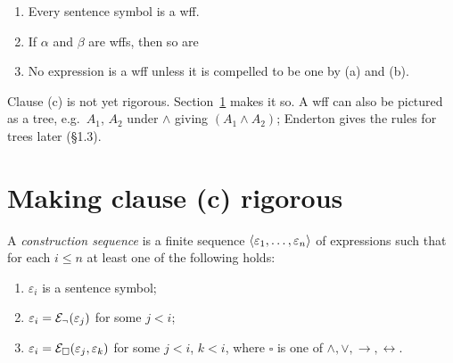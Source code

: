 \documentclass[11pt]{article}
\begin{document}
\begin{definition}\label{def:wff-informal}
\begin{enumerate}[label=(\alph*)]
\item Every sentence symbol is a wff.
\item If $\alpha$ and $\beta$ are wffs, then so are
\item No expression is a wff unless it is compelled to be one by (a) and (b).
\end{enumerate}
\end{definition}

\begin{remark}
Clause (c) is not yet rigorous. Section~\ref{sec:rigorous} makes it so.
A wff can also be pictured as a tree, e.g.\ $A_1$, $A_2$ under $\land$
giving $(A_1\land A_2)$; Enderton gives the rules for trees later (\S1.3).
\end{remark}

\section{Making clause (c) rigorous}\label{sec:rigorous}

\begin{definition}\label{def:construction-sequence}
A \emph{construction sequence} is a finite sequence
$\langle \varepsilon_1,\dots,\varepsilon_n\rangle$ of expressions such that for each
$i\le n$ at least one of the following holds:
\begin{enumerate}[label=(\roman*)]
\item $\varepsilon_i$ is a sentence symbol;
\item $\varepsilon_i = \mathcal{E}_{\neg}(\varepsilon_j)$ for some $j<i$;
\item $\varepsilon_i = \mathcal{E}_{\square}(\varepsilon_j,\varepsilon_k)$ for some
  $j<i$, $k<i$, where $\square$ is one of $\land,\lor,\to,\leftrightarrow$.
\end{enumerate}
\end{definition}

\begin{quantified}
\end{quantified}
\end{document}
